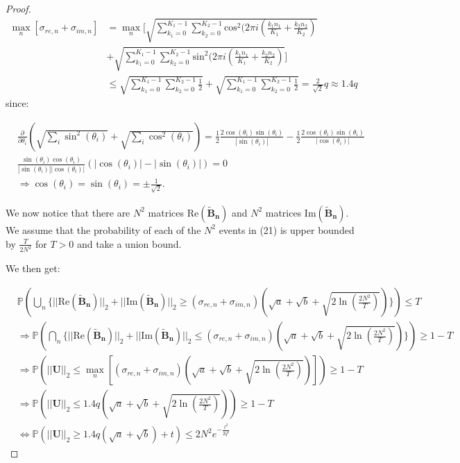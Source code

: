 \documentclass{article} %
\theoremstyle{definition}
\begin{document}
\begin{proof}
\begin{equation}
\begin{split}
\max_n [\sigma_{re,n}+\sigma_{im,n}] &= \max_n [\sqrt{ \sum_{k_1 = 0}^{K_1 - 1} \sum_{k_2 = 0}^{K_2 - 1}\text{cos}^2(2 \pi i (\frac{k_1 n_1}{K_1}+\frac{k_2 n_2}{K_2}) } \\
&+ \sqrt{ \sum_{k_1 = 0}^{K_1 - 1} \sum_{k_2 = 0}^{K_2 - 1}\text{sin}^2(2 \pi i (\frac{k_1 n_1}{K_1}+\frac{k_2 n_2}{K_2}) } ]\\
& \leq \sqrt{ \sum_{k_1 = 0}^{K_1 - 1} \sum_{k_2 = 0}^{K_2 - 1}\frac{1}{2}} + \sqrt{ \sum_{k_1 = 0}^{K_1 - 1} \sum_{k_2 = 0}^{K_2 - 1}\frac{1}{2} } = \frac{2}{\sqrt{2}}q \approx 1.4q
\end{split}
\end{equation}
since:

\begin{equation}
\begin{split}
& \frac{\partial}{\partial\theta_i}(\sqrt{\sum_i\sin^2(\theta_i)}+\sqrt{\sum_i\cos^2(\theta_i)}) = \frac{1}{2}\frac{2\cos(\theta_i)\sin(\theta_i)}{|\sin(\theta_i)|} - \frac{1}{2}\frac{2\cos(\theta_i)\sin(\theta_i)}{|\cos(\theta_i)|} \\
& \frac{\sin(\theta_i)\cos(\theta_i)}{|\sin(\theta_i)||\cos(\theta_i)|}(|\cos(\theta_i)|-|\sin(\theta_i)|) = 0 \\
& \Rightarrow \cos(\theta_i) = \sin(\theta_i) = \pm \frac{1}{\sqrt{2}}.
\end{split}
\end{equation}


We now notice that there are $N^2$ matrices $\text{Re}(\boldsymbol{\tilde{B}_{n}})$ and $N^2$ matrices $\text{Im}(\boldsymbol{\tilde{B}_{n}})$. We assume that the probability of each of the $N^2$ events in (21) is upper bounded by $\frac{T}{2N^2}$ for $T>0$ and take a union bound.

We then get:

\begin{equation}
\begin{split}
& \mathbb{P}(\bigcup_{n} \{ || \text{Re}(\boldsymbol{\tilde{B}_{n}}) ||_2 + || \text{Im}(\boldsymbol{\tilde{B}_{n}}) ||_2 \geq (\sigma_{re,n}+\sigma_{im,n})(\sqrt{a}+\sqrt{b}+\sqrt{2\ln(\frac{2N^2}{T})}) \}) \leq T \\
& \Rightarrow \mathbb{P}(\bigcap_{n} \{ || \text{Re}(\boldsymbol{\tilde{B}_{n}}) ||_2 + || \text{Im}(\boldsymbol{\tilde{B}_{n}}) ||_2 \leq (\sigma_{re,n}+\sigma_{im,n})(\sqrt{a}+\sqrt{b}+\sqrt{2\ln(\frac{2N^2}{T})}) \}) \geq 1-T \\
& \Rightarrow \mathbb{P}(|| \boldsymbol{U} ||_2 \leq \max_n [(\sigma_{re,n}+\sigma_{im,n})(\sqrt{a}+\sqrt{b}+\sqrt{2\ln(\frac{2N^2}{T})})] ) \geq 1-T \\
& \Rightarrow \mathbb{P}(|| \boldsymbol{U} ||_2 \leq 1.4q(\sqrt{a}+\sqrt{b}+\sqrt{2\ln(\frac{2N^2}{T})}) ) \geq 1-T \\
& \Leftrightarrow \mathbb{P}(||\boldsymbol{U}||_2 \geq 1.4q (\sqrt{a} + \sqrt{b}) + t    ) \leq 2N^2e^{-\frac{t^2}{2q^2}}
\end{split}
\end{equation}

\end{proof}
\end{document}
